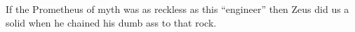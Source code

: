 If the Prometheus of myth was as reckless as this ``engineer'' then Zeus
did us a solid when he chained his dumb ass to that rock.




%
